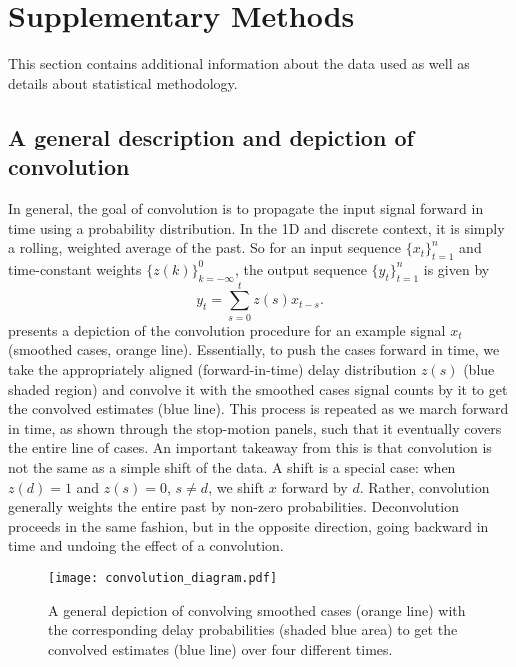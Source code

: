 \section{Supplementary Methods}

This section contains additional information about the data used as well as
details about statistical methodology.

\subsection{A general description and depiction of convolution}
\label{supp:convol}

In general, the goal of convolution is to propagate the input signal forward in
time using a probability distribution. In the 1D and discrete context, it is
simply a rolling, weighted average of the past. So for an input sequence
$\{x_t\}_{t=1}^n$ and time-constant weights $\{z(k)\}_{k=-\infty}^0$, the output
sequence $\{y_t\}_{t=1}^n$ is given by
\begin{equation}
    y_t = \sum_{s=0}^t z(s)x_{t-s}.
\end{equation}
 presents a depiction of the convolution procedure for an
example signal $x_t$ (smoothed cases, orange line). Essentially, to push the
cases forward in time, we take the appropriately aligned (forward-in-time) delay
distribution $z(s)$ (blue shaded region) and convolve it with the smoothed cases
signal counts by it to get the convolved  estimates (blue line). This process is
repeated as we march forward in time, as shown through the stop-motion panels,
such that it eventually covers the entire line of cases. An important takeaway
from this is that convolution is not the same as a simple shift of the data.
A shift is a special case: when $z(d)=1$ and $z(s)=0$, $s\neq d$, we shift $x$
forward by $d$. Rather, convolution generally weights the entire past by
non-zero probabilities. Deconvolution proceeds in the same fashion, but in the
opposite direction, going backward in time and undoing the effect of a
convolution. 

\begin{figure}[H]
\centering
    \texttt{[image: convolution\_diagram.pdf]}
    \caption{A general depiction of convolving smoothed cases (orange line) with the corresponding delay probabilities (shaded blue area) to get the convolved estimates (blue line) over four different times.}
    \label{fig:convol}
\end{figure}

